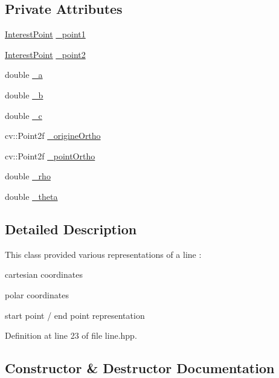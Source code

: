 \subsection*{Private Attributes}
\begin{DoxyCompactItemize}
\item 
\hyperlink{classdefals_1_1_interest_point}{Interest\+Point} \hyperlink{classdefals_1_1_line_a80a5cb3ddcc4a8e0886f11c28b8aec82}{\+\_\+point1}
\item 
\hyperlink{classdefals_1_1_interest_point}{Interest\+Point} \hyperlink{classdefals_1_1_line_a11de125d1a030be2ad42ebe9742ea6ad}{\+\_\+point2}
\item 
double \hyperlink{classdefals_1_1_line_a49d1d66185aa34cb7d16886d77fe8af1}{\+\_\+a}
\item 
double \hyperlink{classdefals_1_1_line_a499efa9575dbc3c187835b26759750b9}{\+\_\+b}
\item 
double \hyperlink{classdefals_1_1_line_ae7a6360dde2b061056d03a4aec9c9855}{\+\_\+c}
\item 
cv\+::\+Point2f \hyperlink{classdefals_1_1_line_aa132df249a860ea17578f8342ff0eaaa}{\+\_\+origine\+Ortho}
\item 
cv\+::\+Point2f \hyperlink{classdefals_1_1_line_a198ea774dbce7e8d8b1d404b22504074}{\+\_\+point\+Ortho}
\item 
double \hyperlink{classdefals_1_1_line_a916e7716467f69bb5cb3c9c6c1d729a3}{\+\_\+rho}
\item 
double \hyperlink{classdefals_1_1_line_ad9528d349ad7537ed883a23966cb8830}{\+\_\+theta}
\end{DoxyCompactItemize}


\subsection{Detailed Description}
This class provided various representations of a line \+:
\begin{DoxyItemize}
\item cartesian coordinates
\item polar coordinates
\item start point / end point representation 
\end{DoxyItemize}

Definition at line 23 of file line.\+hpp.



\subsection{Constructor \& Destructor Documentation}
\mbox{\label{classdefals_1_1_line_abede8f2808bda8a485e99e40c8ff3d38}} 
